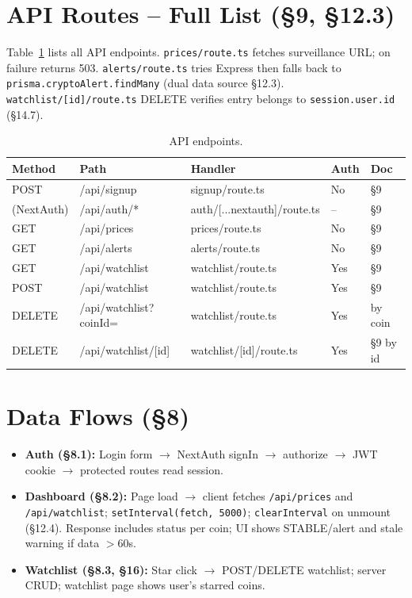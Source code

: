 \documentclass[11pt,a4paper]{report}
\begin{document}
\section{API Routes -- Full List (\S9, \S12.3)}

Table~\ref{tab:api} lists all API endpoints. \texttt{prices/route.ts} fetches surveillance URL; on failure returns 503. \texttt{alerts/route.ts} tries Express then falls back to \texttt{prisma.cryptoAlert.findMany} (dual data source \S12.3). \texttt{watchlist/[id]/route.ts} DELETE verifies entry belongs to \texttt{session.user.id} (\S14.7).

\begin{table}[htbp]
  \centering
  \small
  \begin{tabular}{@{}lllll@{}}
    \toprule
    \textbf{Method} & \textbf{Path} & \textbf{Handler} & \textbf{Auth} & \textbf{Doc} \\
    \midrule
    POST & /api/signup & signup/route.ts & No & \S9 \\
    (NextAuth) & /api/auth/* & auth/[...nextauth]/route.ts & -- & \S9 \\
    GET & /api/prices & prices/route.ts & No & \S9 \\
    GET & /api/alerts & alerts/route.ts & No & \S9 \\
    GET & /api/watchlist & watchlist/route.ts & Yes & \S9 \\
    POST & /api/watchlist & watchlist/route.ts & Yes & \S9 \\
    DELETE & /api/watchlist?coinId= & watchlist/route.ts & Yes & by coin \\
    DELETE & /api/watchlist/[id] & watchlist/[id]/route.ts & Yes & \S9 by id \\
    \bottomrule
  \end{tabular}
  \caption{API endpoints.}
  \label{tab:api}
\end{table}

\section{Data Flows (\S8)}

\begin{itemize}[leftmargin=*]
  \item \textbf{Auth (\S8.1):} Login form $\to$ NextAuth signIn $\to$ authorize $\to$ JWT cookie $\to$ protected routes read session.
  \item \textbf{Dashboard (\S8.2):} Page load $\to$ client fetches \texttt{/api/prices} and \texttt{/api/watchlist}; \texttt{setInterval(fetch, 5000)}; \texttt{clearInterval} on unmount (\S12.4). Response includes status per coin; UI shows STABLE/alert and stale warning if data $>$60s.
  \item \textbf{Watchlist (\S8.3, \S16):} Star click $\to$ POST/DELETE watchlist; server CRUD; watchlist page shows user's starred coins.
\end{itemize}
\end{document}
